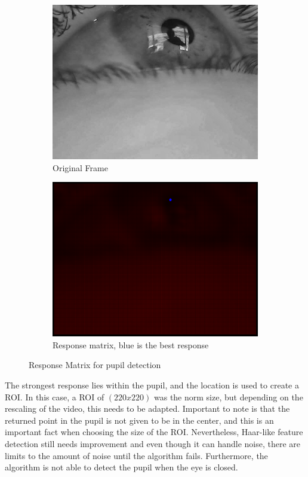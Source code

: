\begin{figure}[h]
    \centering
    \begin{subfigure}{0.5\textwidth}
        \centering
        \includegraphics[width=0.9\linewidth]{plots/results/originalbest.png}
        \caption{Original Frame}
    \end{subfigure}%
    \hfill
    \begin{subfigure}{0.5\textwidth}
        \centering
        \includegraphics[width=0.9\linewidth]{plots/results/responsehaarbest.png}
        \caption{Response matrix, blue is the best response}
    \end{subfigure}%
 
    \caption{Response Matrix for pupil detection}
    \label{fig:limit_haar_good}
\end{figure}

The strongest response lies within the pupil, and the location is used to create a ROI. In this case, a ROI of $(220 x 220)$ was the norm size, but depending on the rescaling of the video, this needs to be adapted. Important to note is that the returned point in the pupil is not given to be in the center, and this is an important fact when choosing the size of the ROI.
Nevertheless, Haar-like feature detection still needs improvement and even though it can handle noise, there are limits to the amount of noise until the algorithm fails. Furthermore, the algorithm is not able to detect the pupil when the eye is closed.

